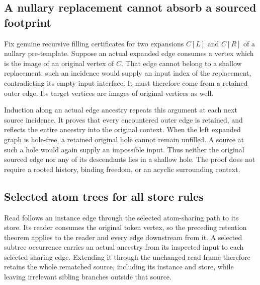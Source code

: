 \subsection{A nullary replacement cannot absorb a sourced footprint}
Fix genuine recursive filling certificates for two expansions $C[L]$ and
$C[R]$ of a nullary pre-template. Suppose an actual expanded edge consumes
a vertex which is the image of an original vertex of $C$. That edge cannot
belong to a shallow replacement: such an incidence would supply an input
index of the replacement, contradicting its empty input interface. It must
therefore come from a retained outer edge. Its target vertices are images
of original vertices as well.

Induction along an actual edge ancestry repeats this argument at each next
source incidence. It proves that every encountered outer edge is retained,
and reflects the entire ancestry into the original context. When the left
expanded graph is hole-free, a retained original hole cannot remain
unfilled. A source at such a hole would again supply an impossible input.
Thus neither the original sourced edge nor any of its descendants lies
in a shallow hole. The proof does not require a rooted history, binding
freedom, or an acyclic surrounding context.
\par{}

\subsection{Selected atom trees for all store rules}
Read follows an instance edge through the selected atom-sharing path to its
store. Its reader consumes the original token vertex, so the preceding
retention theorem applies to the reader and every edge downstream from it.
A selected subtree occurrence carries an actual ancestry from its inspected
input to each selected sharing edge. Extending it through the unchanged read
frame therefore retains the whole rematched source, including its instance
and store, while leaving irrelevant sibling branches outside that source.

